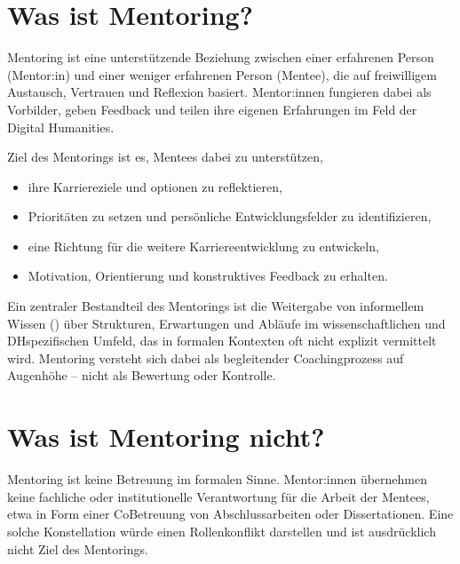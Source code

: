 \documentclass[letterpaper,10pt,english]{jupyterBook}
\begin{document}
\section{Was ist Mentoring?}
\label{\detokenize{mentoring/programm:was-ist-mentoring}}
\sphinxAtStartPar
Mentoring ist eine unterstützende Beziehung zwischen einer erfahrenen Person (Mentor:in) und einer weniger erfahrenen Person (Mentee), die auf freiwilligem Austausch, Vertrauen und Reflexion basiert. Mentor:innen fungieren dabei als Vorbilder, geben Feedback und teilen ihre eigenen Erfahrungen im Feld der Digital Humanities.

\sphinxAtStartPar
Ziel des Mentorings ist es, Mentees dabei zu unterstützen,
\begin{itemize}
\item {} 
\sphinxAtStartPar
ihre Karriereziele und \sphinxhyphen{}optionen zu reflektieren,

\item {} 
\sphinxAtStartPar
Prioritäten zu setzen und persönliche Entwicklungsfelder zu identifizieren,

\item {} 
\sphinxAtStartPar
eine Richtung für die weitere Karriereentwicklung zu entwickeln,

\item {} 
\sphinxAtStartPar
Motivation, Orientierung und konstruktives Feedback zu erhalten.

\end{itemize}

\sphinxAtStartPar
Ein zentraler Bestandteil des Mentorings ist die Weitergabe von informellem Wissen ()
über Strukturen, Erwartungen und Abläufe im wissenschaftlichen und DH\sphinxhyphen{}spezifischen Umfeld, das in formalen Kontexten oft nicht explizit vermittelt wird. Mentoring versteht sich dabei als begleitender Coachingprozess auf Augenhöhe – nicht als Bewertung oder Kontrolle.


\section{Was ist Mentoring nicht?}
\label{\detokenize{mentoring/programm:was-ist-mentoring-nicht}}
\sphinxAtStartPar
Mentoring ist keine Betreuung im formalen Sinne. Mentor:innen übernehmen keine fachliche oder institutionelle Verantwortung für die Arbeit der Mentees, etwa in Form einer Co\sphinxhyphen{}Betreuung von Abschlussarbeiten oder Dissertationen. Eine solche Konstellation würde einen Rollenkonflikt darstellen und ist ausdrücklich nicht Ziel des Mentorings.
\end{document}
